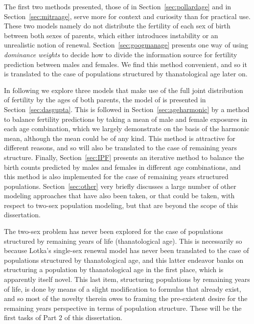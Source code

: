 The first two methods presented, those of \citet{pollard1948measurement} in
Section~\ref{sec:pollardage} and
\citet{mitra1978derivation} in Section~\ref{sec:mitraage}, serve more for context and curiosity than for
practical use. These two models namely do not distribute the fertility of each
sex of birth between both sexes of parents, which either introduces instability
or an unrealistic notion of renewal. Section~\ref{sec:googmanage} presents one
way of using \textit{dominance weights} to decide how to divide the information source 
for fertility prediction between males and females. We find this method
convenient, and so it is translated to the case of populations structured by
thanatological age later on. 

In following we explore three models that make use of the full joint
distribution of fertility by the ages of both parents, the model of
\citet{gupta1978alternative} is presented in Section~\ref{sec:dasgupta}. This is
followed in Section~\ref{sec:ageharmonic} by a method to balance fertility
predictions by taking a mean of male and female exposures in each age combination, 
which we largely demonstrate on the
basis of the harmonic mean, although the mean could be of any kind. This method
is attractive for different reasons, and so will also be translated to the case
of remaining years structure. Finally, Section~\ref{sec:IPF} presents an
iterative method to balance the birth counts predicted by males and females in
different age combinations, and this method is also implemented for the case of
remaining years structured populations. Section~\ref{sec:other} very briefly
discusses a large number of other modeling approaches that have also been
taken, or that could be taken, with respect to two-sex population modeling, but
that are beyond the scope of this dissertation.

The two-sex problem has never been explored for the case of populations
structured by remaining years of life (thanatological age). This is necessarily 
so because Lotka's single-sex renewal model \citep{sharpe1911problem} has never
been translated to the case of populations structured by thanatological age, 
and this latter endeavor banks on structuring a population by 
thanatological age in the first place, which is apparently itself novel. This
last item, structuring populations by remaining years of life, is done by means
of a slight modification to formulas that already exist, and so most of the
novelty therein owes to framing the pre-existent desire for the remaining years perspective in
terms of population structure. These will be the first tasks of Part 2
of this dissertation.


